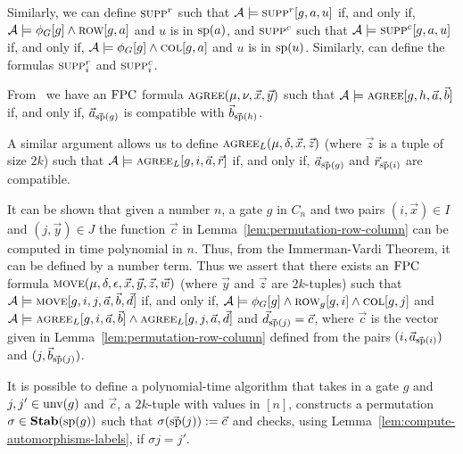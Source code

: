 \documentclass[../paper.tex]{subfiles}
\begin{document}
Similarly, we can define $\textsc{supp}^r$ such that $\mathcal{A} \models
\textsc{supp}^r[g, a, u]$ if, and only if, $\mathcal{A} \models \phi_G [g] \land
\textsc{row}[g, a]$ and $u$ is in $\text{sp}(a)$, and $\textsc{supp}^c$ such that
$\mathcal{A} \models \textsc{supp}^c[g, a, u]$ if, and only if, $\mathcal{A} \models
\phi_G [g] \land \textsc{col}[g, a]$ and $u$ is in $\text{sp}(u)$. Similarly, can
define the formulas $\textsc{supp}^r_i$ and $\textsc{supp}^c_i$.

From~\cite{AndersonD17} we have an $\text{\upshape FPC}$ formula
$\textsc{agree}(\mu, \nu, \vec{x}, \vec{y})$ such that $\mathcal{A} \models
\textsc{agree}[g, h, \vec{a}, \vec{b}]$ if, and only if, $\vec{a}_{\vec{\text{sp}}(g)}$
is compatible with $\vec{b}_{\vec{\text{sp}}(h)}$.


A similar argument allows us to define $\textsc{agree}_L (\mu, \delta , \vec{x},
\vec{z})$ (where $\vec{z}$ is a tuple of size $2k$) such that $\mathcal{A}
\models \textsc{agree}_L [g, i, \vec{a}, \vec{r}]$ if, and only if,
$\vec{a}_{\vec{\text{sp}}(g)}$ and $\vec{r}_{\vec{\text{sp}}(i)}$ are compatible.

It can be shown that given a number $n$, a gate $g$ in $C_n$ and two pairs $(i,
\vec{x}) \in I$ and $(j, \vec{y}) \in J$ the function $\vec{c}$ in
Lemma~\ref{lem:permutation-row-column} can be computed in time polynomial in
$n$. Thus, from the Immerman-Vardi Theorem, it can be defined by a number term.
Thus we assert that there exists an $\text{\upshape FPC}$ formula $\textsc{move} (\mu, \delta,
\epsilon, \vec{x}, \vec{y}, \vec{z}, \vec{w})$ (where $\vec{y}$ and $\vec{z}$
are $2k$-tuples) such that $\mathcal{A} \models \textsc{move} [g, i, j, \vec{a},
\vec{b}, \vec{d}]$ if, and only if, $\mathcal{A} \models \phi_G [g] \land
\textsc{row}_g[g,i] \land \textsc{col}[g, j]$ and $\mathcal{A} \models \textsc{agree}_L [g,
i, \vec{a}, \vec{b}] \land \textsc{agree}_L [g, j, \vec{a}, \vec{d}]$ and
$\vec{d}_{\vec{\text{sp}}(j)} = \vec{c}$, where $\vec{c}$ is the vector given in
Lemma~\ref{lem:permutation-row-column} defined from the pairs $(i,
\vec{a}_{\vec{\text{sp}}(i)})$ and $(j, \vec{b}_{\vec{\text{sp}}(j)})$.

It is possible to define a polynomial-time algorithm that takes in a gate $g$
and $j, j' \in \text{unv}(g)$ and $\vec{c}$, a $2k$-tuple with values in $[n]$,
constructs a permutation $\sigma \in \text{\textbf{Stab}} (\text{sp} (g))$ such that $\sigma
(\vec{\text{sp}}(j)) := \vec{c}$ and checks, using
Lemma~\ref{lem:compute-automorphisms-labels}, if $\sigma j = j'$.
\end{document}
